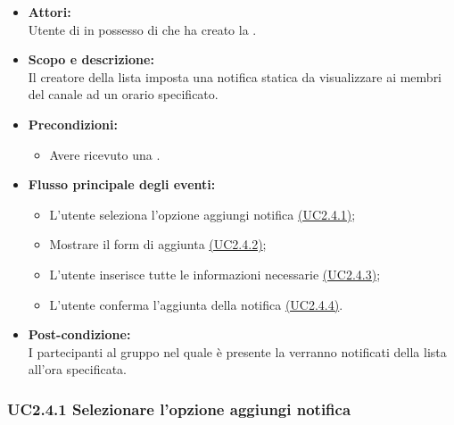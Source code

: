 \begin{itemize}
	\item \textbf{Attori:}
	\\Utente di  in possesso di \ProjectName{} che ha creato la .
	\item \textbf{Scopo e descrizione:} 
	\\Il creatore della lista imposta una notifica statica da visualizzare ai membri del canale ad un orario specificato.
	\item \textbf{Precondizioni:}
	\begin{itemize}
		\item Avere ricevuto una  .
	\end{itemize}
	\item \textbf{Flusso principale degli eventi:}
	\begin{itemize}
		\item L'utente seleziona l'opzione aggiungi notifica \hyperref[UC2.4.1]{(UC2.4.1)};
		\item Mostrare il form di aggiunta \hyperref[UC2.4.2]{(UC2.4.2)};
		\item L'utente inserisce tutte le informazioni necessarie \hyperref[UC2.4.3]{(UC2.4.3)};
		\item L'utente conferma l'aggiunta della notifica \hyperref[UC2.4.4]{(UC2.4.4)}.
	\end{itemize}
	\item \textbf{Post-condizione:}
	\\I partecipanti al gruppo nel quale è presente la  verranno notificati della lista all'ora specificata.
\end{itemize}

\subsubsection{UC2.4.1 Selezionare l'opzione aggiungi notifica} \label{UC2.4.1}

